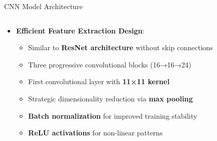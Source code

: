 \documentclass[aspectratio=169,8pt]{beamer}  %
\begin{document}
\begin{frame}{CNN Model Architecture}
\begin{columns}[T]
\begin{column}{0.6\textwidth}
\begin{itemize}
\item \textbf{Efficient Feature Extraction Design}:
  \begin{itemize}
  \item Similar to \textbf{ResNet architecture} without skip connections
  \item Three progressive convolutional blocks (16→16→24)
  \item First convolutional layer with \textbf{11×11 kernel}
  \item Strategic dimensionality reduction via \textbf{max pooling}
  \item \textbf{Batch normalization} for improved training stability
  \item \textbf{ReLU activations} for non-linear patterns
  \end{itemize}
\end{itemize}


\end{column}
\end{columns}
\end{frame}
\end{document}
